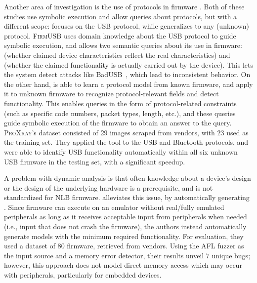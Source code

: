 Another area of investigation is the use of protocols in firmware \cite{hernandez2017firmusb,fowze2021proxray}.
Both of these studies use symbolic execution and allow queries about protocols, but with a different scope:  focuses on the USB protocol, while  generalizes to any (unknown) protocol.
\textsc{FirmUSB} uses domain knowledge about the USB protocol to guide symbolic execution, and allows two semantic queries about its use in firmware:  (whether claimed device characteristics reflect the real characteristics) and  (whether the claimed functionality is actually carried out by the device).
This lets the system detect attacks like BadUSB~\cite{badusb}, which lead to inconsistent behavior.
On the other hand,  is able to learn a protocol model from known firmware, and apply it to unknown firmware to recognize protocol-relevant fields and detect functionality.
This enables queries in the form of protocol-related constraints (such as specific code numbers, packet types, length, etc.), and these queries guide symbolic execution of the firmware to obtain an answer to the query.
\textsc{ProXray}'s dataset consisted of \num{29} images scraped from vendors, with \num{23} used as the training set.
They applied the tool to the USB and Bluetooth protocols, and were able to identify USB functionality automatically within all six unknown USB firmware in the testing set, with a significant speedup.

A problem with dynamic analysis is that often knowledge about a device's design or the design of the underlying hardware is a prerequisite, and is not standardized for NLB firmware.
 alleviates this issue, by automatically generating .
Since firmware can execute on an emulator without real/fully emulated peripherals as long as it receives acceptable input from peripherals when needed (i.e., input that does not crash the firmware), the authors instead automatically generate models with the minimum required functionality.
For evaluation, they used a dataset of \num{80} firmware, retrieved from vendors.
Using the AFL fuzzer as the input source and a memory error detector, their results unveil 7 unique bugs; however, this approach does not model direct memory access which may occur with peripherals, particularly for embedded devices.

